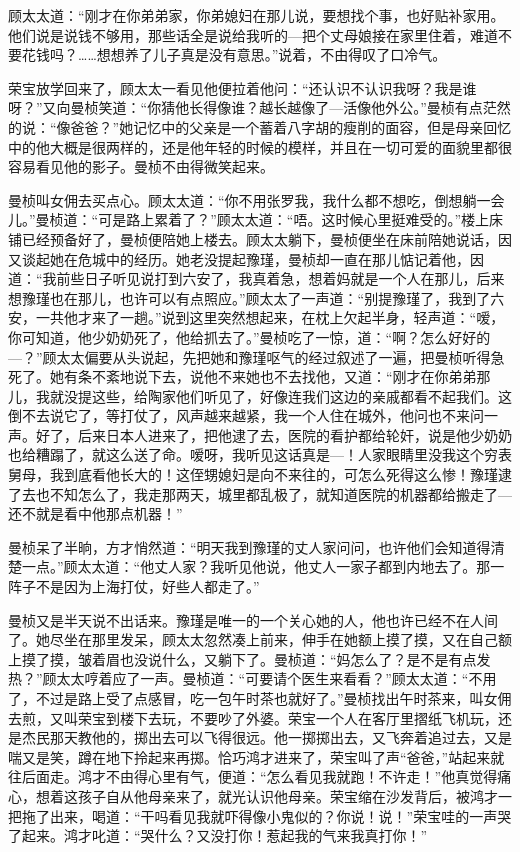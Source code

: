 \par 顾太太道：“刚才在你弟弟家，你弟媳妇在那儿说，要想找个事，也好贴补家用。他们说是说钱不够用，那些话全是说给我听的—把个丈母娘接在家里住着，难道不要花钱吗？……想想养了儿子真是没有意思。”说着，不由得叹了口冷气。
\par 荣宝放学回来了，顾太太一看见他便拉着他问：“还认识不认识我呀？我是谁呀？”又向曼桢笑道：“你猜他长得像谁？越长越像了—活像他外公。”曼桢有点茫然的说：“像爸爸？”她记忆中的父亲是一个蓄着八字胡的瘦削的面容，但是母亲回忆中的他大概是很两样的，还是他年轻的时候的模样，并且在一切可爱的面貌里都很容易看见他的影子。曼桢不由得微笑起来。
\par 曼桢叫女佣去买点心。顾太太道：“你不用张罗我，我什么都不想吃，倒想躺一会儿。”曼桢道：“可是路上累着了？”顾太太道：“唔。这时候心里挺难受的。”楼上床铺已经预备好了，曼桢便陪她上楼去。顾太太躺下，曼桢便坐在床前陪她说话，因又谈起她在危城中的经历。她老没提起豫瑾，曼桢却一直在那儿惦记着他，因道：“我前些日子听见说打到六安了，我真着急，想着妈就是一个人在那儿，后来想豫瑾也在那儿，也许可以有点照应。”顾太太了一声道：“别提豫瑾了，我到了六安，一共他才来了一趟。”说到这里突然想起来，在枕上欠起半身，轻声道：“嗳，你可知道，他少奶奶死了，他给抓去了。”曼桢吃了一惊，道：“啊？怎么好好的—？”顾太太偏要从头说起，先把她和豫瑾呕气的经过叙述了一遍，把曼桢听得急死了。她有条不紊地说下去，说他不来她也不去找他，又道：“刚才在你弟弟那儿，我就没提这些，给陶家他们听见了，好像连我们这边的亲戚都看不起我们。这倒不去说它了，等打仗了，风声越来越紧，我一个人住在城外，他问也不来问一声。好了，后来日本人进来了，把他逮了去，医院的看护都给轮奸，说是他少奶奶也给糟蹋了，就这么送了命。嗳呀，我听见这话真是—！人家眼睛里没我这个穷表舅母，我到底看他长大的！这侄甥媳妇是向不来往的，可怎么死得这么惨！豫瑾逮了去也不知怎么了，我走那两天，城里都乱极了，就知道医院的机器都给搬走了—还不就是看中他那点机器！”
\par 曼桢呆了半晌，方才悄然道：“明天我到豫瑾的丈人家问问，也许他们会知道得清楚一点。”顾太太道：“他丈人家？我听见他说，他丈人一家子都到内地去了。那一阵子不是因为上海打仗，好些人都走了。”
\par 曼桢又是半天说不出话来。豫瑾是唯一的一个关心她的人，他也许已经不在人间了。她尽坐在那里发呆，顾太太忽然凑上前来，伸手在她额上摸了摸，又在自己额上摸了摸，皱着眉也没说什么，又躺下了。曼桢道：“妈怎么了？是不是有点发热？”顾太太哼着应了一声。曼桢道：“可要请个医生来看看？”顾太太道：“不用了，不过是路上受了点感冒，吃一包午时茶也就好了。”曼桢找出午时茶来，叫女佣去煎，又叫荣宝到楼下去玩，不要吵了外婆。荣宝一个人在客厅里摺纸飞机玩，还是杰民那天教他的，掷出去可以飞得很远。他一掷掷出去，又飞奔着追过去，又是喘又是笑，蹲在地下拎起来再掷。恰巧鸿才进来了，荣宝叫了声“爸爸，”站起来就往后面走。鸿才不由得心里有气，便道：“怎么看见我就跑！不许走！”他真觉得痛心，想着这孩子自从他母亲来了，就光认识他母亲。荣宝缩在沙发背后，被鸿才一把拖了出来，喝道：“干吗看见我就吓得像小鬼似的？你说！说！”荣宝哇的一声哭了起来。鸿才叱道：“哭什么？又没打你！惹起我的气来我真打你！”
